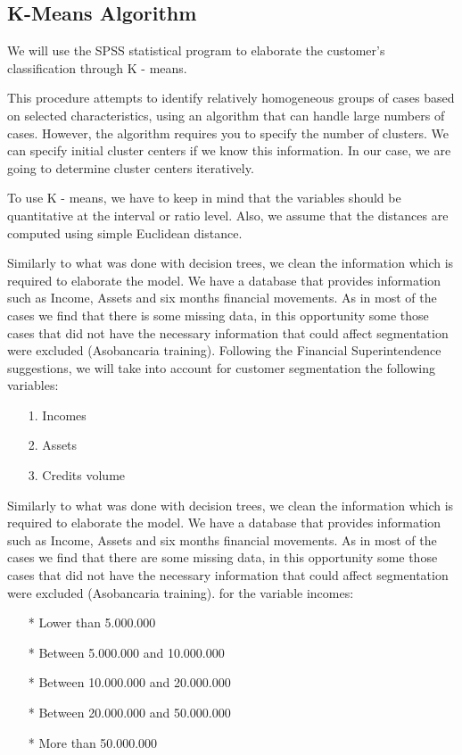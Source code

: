  \subsection{K-Means Algorithm}
We will use the SPSS statistical program to elaborate the customer’s classification through K - means.\par
This procedure attempts to identify relatively homogeneous groups of cases based on selected characteristics, using an algorithm that can handle large numbers of cases.  However, the algorithm requires you to specify the number of clusters.  We can specify initial cluster centers if we know this information. In our case, we are going to determine cluster centers iteratively.\par
To use K - means, we have to keep in mind that the variables should be quantitative at the interval or ratio level.  Also, we assume that the distances are computed using simple Euclidean distance.\par
Similarly to what was done with decision trees, we clean the information which is required to elaborate the model. We have a database that provides information such as Income, Assets and six months financial movements. As in most of the cases we find that there is some missing data, in this opportunity some those cases that did not have the necessary information that could affect segmentation were excluded (Asobancaria training).
Following the Financial Superintendence suggestions, we will take into account for customer segmentation the following variables:
\begin{itemize}
\item[1.] Incomes
\item[2.] Assets
\item[3.] Credits volume
\end{itemize}
Similarly to what was done with decision trees, we clean the information which is required to elaborate the model. We have a database that provides information such as Income, Assets and six months financial movements. As in most of the cases we find that there are some missing data, in this opportunity some those cases that did not have the necessary information that could affect segmentation were excluded (Asobancaria training).
for the variable incomes:
\begin{itemize}
\item[*] Lower than 5.000.000
\item[*] Between 5.000.000 and 10.000.000
\item[*] Between 10.000.000 and 20.000.000
\item[*] Between 20.000.000 and 50.000.000
\item[*] More than 50.000.000
\end{itemize}
